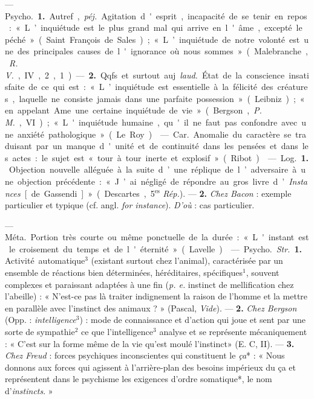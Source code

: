 \begin{itemize}[leftmargin=1cm, label=, itemsep=1pt]
 — \si{Psycho.} {\bf 1.} Autref., {\it péj.} Agitation
d'esprit, incapacité de se tenir en repos : « L’inquiétude est le plus grand
mal qui arrive en l'âme,
excepté le péché » (Saint François de Sales); « L’inquiétude de notre volonté
est une des principales causes de l'ignorance où nous sommes » (Malebranche,
{\it R. V.}, IV, 2, 1). — {\bf 2.} Qqfs. et surtout auj. {\it laud.} État de
la conscience insatisfaite de ce qui est : « L’inquiétude est essentielle à
la félicité des créatures, laquelle ne consiste jamais dans une parfaite
possession » (Leibniz); « ... en appelant Ame une certaine inquiétude de
vie » (Bergson, {\it P. M.}, VI); « L'inquiétude humaine, qu'il ne faut pas
confondre avec une anxiété pathologique... » (Le Roy).

 — \si{Car.} Anomalie du caractère se traduisant par
un manque d'unité et de continuité dans les pensées et dans les actes : le
sujet est « tour à tour inerte et explosif » (Ribot).

 — \si{Log.} {\bf 1.} Objection nouvelle alléguée à la suite
d’une réplique de l’adversaire à une objection précédente : « J’ai négligé de
répondre au gros livre d’{\it Instances} [de Gassendi] » (Descartes,
5$^\text{es}$ {\it Rép.}). — {\bf 2.} {\it Chez Bacon} : exemple particulier
et typique (cf. angl. {\it for instance}). {\it D'où} : cas particulier.

 — \si{Méta.} Portion très courte ou même ponctuelle de la
durée : « L'instant est le croisement du temps et de l'éternité » (Lavelle).

 — \si{Psycho.} {\it Str.} {\bf 1.} Activité automatique$^3$
(existant surtout chez l'animal), caractérisée par un ensemble de réactions
bien déterminées, héréditaires, spécifiques$^1$, souvent complexes et
paraissant adaptées à une fin ({\it p. e.} instinct de mellification chez
l’abeille) : « N’est-ce pas là traiter indignement la
raison de l’homme et la mettre en parallèle avec l'instinct des
animaux ? » (Pascal, {\it Vide}). — {\bf 2.} {\it Chez Bergson} (Opp. :
{\it intelligence}$^3$) : mode de connaissance et d’action qui joue et sent
par une sorte de sympathie$^2$ ce que l'intelligence$^3$ analyse et se
représente mécaniquement : « C’est sur la forme même de la vie qu'est moulé
l'instinct» (E. C, II). —  {\bf 3.} {\it Chez Freud} : forces psychiques
inconscientes qui constituent le {\it ça}* : « Nous donnons aux forces qui
agissent à l'arrière-plan des besoins impérieux du ça et représentent dans le
psychisme les exigences d’ordre somatique*, le nom d’{\it instincts}. »


\end{itemize}
